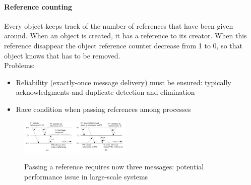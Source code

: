 \documentclass[10pt,a4paper]{article}
\begin{document}
\paragraph{Reference counting}
Every object keeps track of the number of references that have been given around. When an object is created, it has a reference to its creator. When this reference disappear the object reference counter decrease from 1 to 0, so that object knows that has to be removed. \\
Problems:
\begin{itemize}
	\item Reliability (exactly-once message delivery) must be ensured: typically acknowledgments and duplicate detection and elimination
	\item Race condition when passing references among processes
\end{itemize}
\begin{figure}[h!]
 \hfill \includegraphics[width=150pt]{images/ref-counting.png}\hspace*{\fill}
  \label{fig:ref-counting}
  \caption{Passing a reference requires now three messages: potential performance issue in large-scale systems}
\end{figure}
\end{document}
